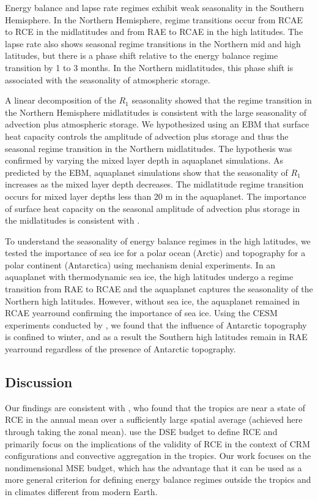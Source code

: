 \documentclass{ametsocV5}
\begin{document}
Energy balance and lapse rate regimes exhibit weak seasonality in the Southern Hemisphere. In the Northern Hemisphere, regime transitions occur from RCAE to RCE in the midlatitudes and from RAE to RCAE in the high latitudes. The lapse rate also shows seasonal regime transitions in the Northern mid and high latitudes, but there is a phase shift relative to the energy balance regime transition by 1 to 3 months. In the Northern midlatitudes, this phase shift is associated with the seasonality of atmospheric storage.

A linear decomposition of the $R_1$ seasonality showed that the regime transition in the Northern Hemisphere midlatitudes is consistent with the large seasonality of advection plus atmospheric storage. We hypothesized using an EBM that surface heat capacity controls the amplitude of advection plus storage and thus the seasonal regime transition in the Northern midlatitudes. The hypothesis was confirmed by varying the mixed layer depth in aquaplanet simulations. As predicted by the EBM, aquaplanet simulations show that the seasonality of $R_1$ increases as the mixed layer depth decreases. The midlatitude regime transition occurs for mixed layer depths less than 20 m in the aquaplanet. The importance of surface heat capacity on the seasonal amplitude of advection plus storage in the midlatitudes is consistent with \cite{barpanda2020}.

To understand the seasonality of energy balance regimes in the high latitudes, we tested the importance of sea ice for a polar ocean (Arctic) and topography for a polar continent (Antarctica) using mechanism denial experiments. In an aquaplanet with thermodynamic sea ice, the high latitudes undergo a regime transition from RAE to RCAE and the aquaplanet captures the seasonality of the Northern high latitudes. However, without sea ice, the aquaplanet remained in RCAE yearround confirming the importance of sea ice. Using the CESM experiments conducted by \cite{hahn2020}, we found that the influence of Antarctic topography is confined to winter, and as a result the Southern high latitudes remain in RAE yearround regardless of the presence of Antarctic topography.

\subsection{Discussion}
Our findings are consistent with \cite{jakob2019}, who found that the tropics are near a state of RCE in the annual mean over a sufficiently large spatial average (achieved here through taking the zonal mean). \cite{jakob2019} use the DSE budget to define RCE and primarily focus on the implications of the validity of RCE in the context of CRM configurations and convective aggregation in the tropics. Our work focuses on the nondimensional MSE budget, which has the advantage that it can be used as a more general criterion for defining energy balance regimes outside the tropics and in climates different from modern Earth.
\end{document}
